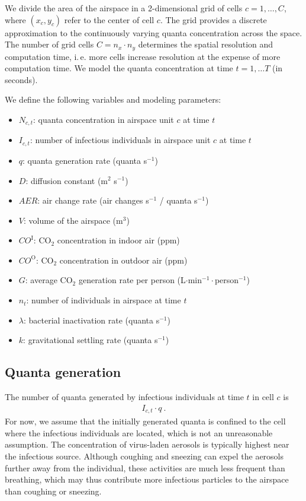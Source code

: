 \documentclass[fleqn,11pt]{wlscirep_supp}
\newcommand\ie{i.\,e.\xspace}
\begin{document}
We divide the area of the airspace in a 2-dimensional grid of cells $c = 1, \dots, C$, where $(x_c, y_c)$ refer to the center of cell $c$. The grid provides a discrete approximation to the continuously varying quanta concentration across the space. The number of grid cells $C = n_x \cdot n_y$ determines the spatial resolution and computation time, \ie more cells increase resolution at the expense of more computation time. We model the quanta concentration at time $t = 1, \dots T$ (in seconds).

We define the following variables and modeling parameters:
\begin{itemize}
    \item $N_{c,t}$: quanta concentration in airspace unit $c$ at time $t$
    \item $I_{c,t}$: number of infectious individuals in airspace unit $c$ at time $t$
    \item $q$: quanta generation rate (quanta s$^{-1}$)
    \item $D$: diffusion constant (m$^2$ s$^{-1}$)
    \item $AER$: air change rate (air changes s$^{-1}$ / quanta s$^{-1}$)
    \item $V$: volume of the airspace (m$^3$)
    \item $CO^{\text{I}}$: CO$_2$ concentration in indoor air (ppm)
    \item $CO^{\text{O}}$: CO$_2$ concentration in outdoor air (ppm)
    \item $G$: average CO$_2$ generation rate per person (L$\cdot$min$^{-1}\cdot$person$^{-1}$)
    \item $n_t$: number of individuals in airspace at time $t$
    \item $\lambda$: bacterial inactivation rate (quanta s$^{-1}$)
    \item $k$: gravitational settling rate (quanta s$^{-1}$)
\end{itemize}

\subsection{Quanta generation}\label{sec:quanta-generation}

The number of quanta generated by infectious individuals at time $t$ in cell $c$ is 
\begin{align}\label{eq:generation}
    I_{c,t} \cdot q ~.
\end{align}
For now, we assume that the initially generated quanta is confined to the cell where the infectious individuals are located, which is not an unreasonable assumption. The concentration of virus-laden aerosols is typically highest near the infectious source\cite{Vuorinen2020SafSci,Chen2020BuildEnv}. Although coughing and sneezing can expel the aerosols further away from the individual, these activities are much less frequent than breathing, which may thus contribute more infectious particles to the airspace than coughing or sneezing\cite{Dinkele2022AJRCCM}. 
\end{document}
